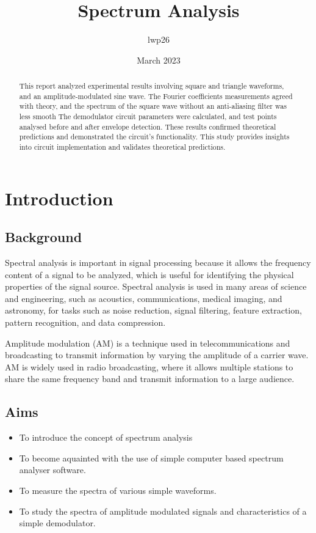 \documentclass[12pt]{article}
\begin{document}
\title{Spectrum Analysis}
\author{lwp26}
\date{March 2023}
\maketitle

\begin{abstract}
    \centering
    This report analyzed experimental results involving square and triangle waveforms, and an amplitude-modulated sine wave.
    The Fourier coefficients measurements agreed with theory, and the spectrum of the square wave without an anti-aliasing filter was less smooth
    The demodulator circuit parameters were calculated, and test points analysed before and after envelope detection.
    These results confirmed theoretical predictions and demonstrated the circuit's functionality. This study provides insights into circuit implementation and validates theoretical predictions.
\end{abstract}


\section{Introduction}

\subsection{Background}
Spectral analysis is important in signal processing because it allows the frequency content of a signal to be analyzed, which is useful for identifying the physical properties of the signal source. Spectral analysis is used in many areas of science and engineering, such as acoustics, communications, medical imaging, and astronomy, for tasks such as noise reduction, signal filtering, feature extraction, pattern recognition, and data compression.

Amplitude modulation (AM) is a technique used in telecommunications and broadcasting to transmit information by varying the amplitude of a carrier wave. AM is widely used in radio broadcasting, where it allows multiple stations to share the same frequency band and transmit information to a large audience.

\subsection{Aims}

\begin{itemize}
    \item To introduce the concept of spectrum analysis
    \item To become aquainted with the use of simple computer based spectrum analyser software.
    \item To measure the spectra of various simple waveforms.
    \item To study the spectra of amplitude modulated signals and characteristics of a simple demodulator.
\end{itemize}
\end{document}

